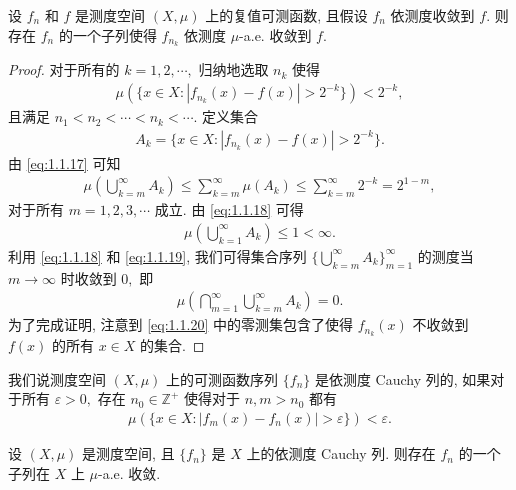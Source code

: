 \documentclass[../../main.tex]{subfiles}%
\begin{document}
\begin{theorem}
设 \(f_n\) 和 \(f\) 是测度空间 \((X, \mu)\) 上的复值可测函数, 且假设 \(f_n\) 依测度收敛到 \(f.\) 则存在 \(f_n\) 的一个子列使得 \(f_{n_k}\) 依测度 \(\mu\)-a.e. 收敛到 \(f.\)
\end{theorem}

\begin{proof}
对于所有的 \(k = 1, 2, \cdots,\) 归纳地选取 \(n_k\) 使得
\begin{align}
\mu(\{x \in X : |f_{n_k}(x) - f(x)| > 2^{-k}\}) < 2^{-k}, \label{eq:1.1.17}
\end{align}
且满足 \(n_1 < n_2 < \cdots < n_k < \cdots.\) 定义集合
\begin{align*}
A_k = \{x \in X : |f_{n_k}(x) - f(x)| > 2^{-k}\}.
\end{align*}
由 \eqref{eq:1.1.17} 可知
\begin{align}
\mu\left( \bigcup\limits_{k=m}^{\infty} A_k \right) \leqslant \sum\limits_{k=m}^{\infty} \mu(A_k) \leqslant \sum\limits_{k=m}^{\infty} 2^{-k} = 2^{1-m}, \label{eq:1.1.18}
\end{align}
对于所有 \(m = 1, 2, 3, \cdots\) 成立. 由 \eqref{eq:1.1.18} 可得
\begin{align}
\mu\left( \bigcup\limits_{k=1}^{\infty} A_k \right) \leqslant 1 < \infty. \label{eq:1.1.19}
\end{align}
利用 \eqref{eq:1.1.18} 和 \eqref{eq:1.1.19}, 我们可得集合序列 \(\{\bigcup\limits_{k=m}^{\infty} A_k\}_{m=1}^{\infty}\) 的测度当 \(m \to \infty\) 时收敛到 \(0,\) 即
\begin{align}
\mu\left( \bigcap\limits_{m=1}^{\infty} \bigcup\limits_{k=m}^{\infty} A_k \right) = 0. \label{eq:1.1.20}
\end{align}
为了完成证明, 注意到 \eqref{eq:1.1.20} 中的零测集包含了使得 \(f_{n_k}(x)\) 不收敛到 \(f(x)\) 的所有 \(x \in X\) 的集合.
\end{proof}

\begin{definition}
我们说测度空间 \((X, \mu)\) 上的可测函数序列 \(\{f_n\}\) 是依测度 Cauchy 列的, 如果对于所有 \(\varepsilon > 0,\) 存在 \(n_0 \in \mathbb{Z}^+\) 使得对于 \(n, m > n_0\) 都有
\begin{align*}
\mu(\{x \in X : |f_m(x) - f_n(x)| > \varepsilon\}) < \varepsilon.
\end{align*}
\end{definition}

\begin{theorem}
设 \((X, \mu)\) 是测度空间, 且 \(\{f_n\}\) 是 \(X\) 上的依测度 Cauchy 列. 则存在 \(f_n\) 的一个子列在 \(X\) 上 \(\mu\)-a.e. 收敛.
\end{theorem}
\end{document}
